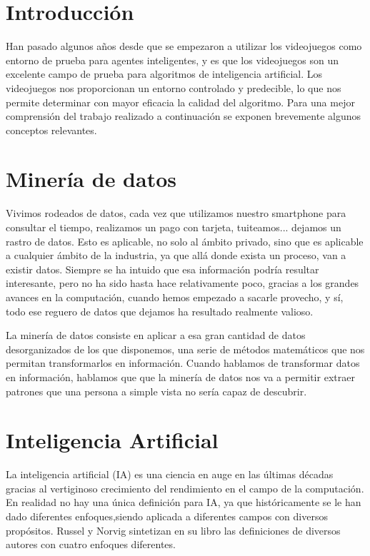



\section{Introducción}
Han pasado algunos años desde que se empezaron a utilizar los videojuegos como entorno de prueba para agentes inteligentes, y es que los videojuegos son un excelente campo de prueba para algoritmos de inteligencia artificial. Los videojuegos nos proporcionan un entorno controlado y predecible, lo que nos permite determinar con mayor eficacia la calidad del algoritmo. Para una mejor comprensión del trabajo realizado a continuación se exponen brevemente algunos conceptos relevantes.

\section{Minería de datos}
Vivimos rodeados de datos, cada vez que utilizamos nuestro smartphone para consultar el tiempo, realizamos un pago con tarjeta, tuiteamos... dejamos un rastro de datos. Esto es aplicable, no solo al ámbito privado, sino que es aplicable a cualquier ámbito de la industria, ya que allá donde exista un proceso, van a existir datos. Siempre se ha intuido que esa información podría resultar interesante, pero no ha sido hasta hace relativamente poco, gracias a los grandes avances en la computación, cuando hemos empezado a sacarle provecho, y sí, todo ese reguero de datos que dejamos ha resultado realmente valioso.

La minería de datos consiste en aplicar a esa gran cantidad de datos desorganizados de los que disponemos, una serie de métodos matemáticos que nos permitan transformarlos en información. Cuando hablamos de transformar datos en información, hablamos que que la minería de datos nos va a permitir extraer patrones que una persona a simple vista no sería capaz de descubrir. 

\section{Inteligencia Artificial}
La inteligencia artificial (IA) es una ciencia en auge en las últimas décadas gracias al vertiginoso crecimiento del rendimiento en el campo de la computación. En realidad no hay una única definición para IA, ya que históricamente se le han dado diferentes enfoques,siendo aplicada a diferentes campos con diversos propósitos. Russel y Norvig \cite{Russell_Norvig} sintetizan en su libro las definiciones de diversos autores con cuatro enfoques diferentes.

